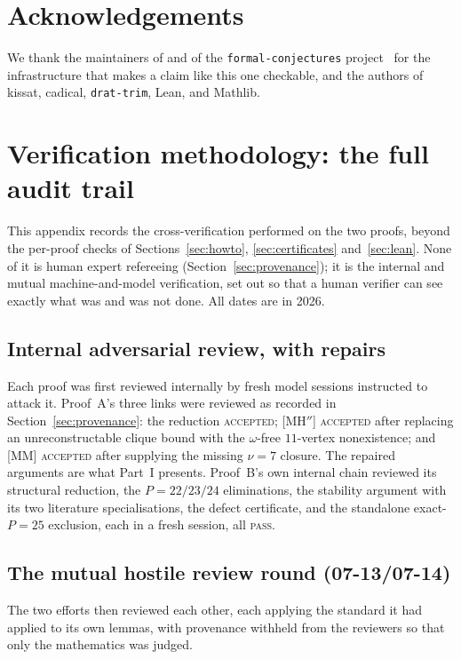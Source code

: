 \documentclass[11pt,reqno]{amsart}
\theoremstyle{definition}
\theoremstyle{remark}
\begin{document}
\section*{Acknowledgements}
We thank the maintainers of \cite{Bloom617} and of the \texttt{formal-conjectures}
project~\cite{FC} for the infrastructure that makes a claim like this one checkable,
and the authors of kissat, cadical, \texttt{drat-trim}, Lean, and Mathlib.

\appendix
\section{Verification methodology: the full audit trail}\label{app:methodology}

This appendix records the cross-verification performed on the two proofs, beyond the
per-proof checks of Sections~\ref{sec:howto}, \ref{sec:certificates}
and~\ref{sec:lean}. None of it is human expert refereeing
(Section~\ref{sec:provenance}); it is the internal and mutual machine-and-model
verification, set out so that a human verifier can see exactly what was and was not done.
All dates are in 2026.

\subsection{Internal adversarial review, with repairs}
Each proof was first reviewed internally by fresh model sessions instructed to attack it.
Proof~A's three links were reviewed as recorded in Section~\ref{sec:provenance}: the
reduction \textsc{accepted}; \textsf{[MH$''$]} \textsc{accepted} after replacing an
unreconstructable clique bound with the $\omega$-free $11$-vertex nonexistence; and
\textsf{[MM]} \textsc{accepted} after supplying the missing $\nu=7$ closure. The repaired
arguments are what Part~I presents. Proof~B's own internal chain reviewed its structural
reduction, the $P=22/23/24$ eliminations, the stability argument with its two literature
specialisations, the defect certificate, and the standalone exact-$P=25$ exclusion, each
in a fresh session, all \textsc{pass}.

\subsection{The mutual hostile review round (07-13/07-14)}
The two efforts then reviewed each other, each applying the standard it had applied to its
own lemmas, with provenance withheld from the reviewers so that only the mathematics was
judged.
\end{document}
